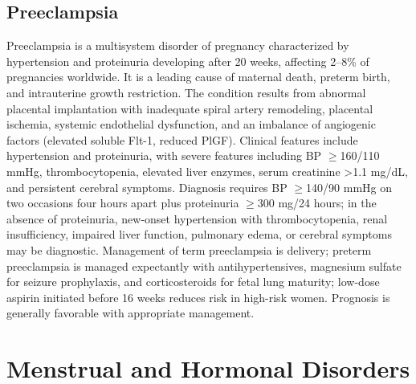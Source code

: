 \subsection{Preeclampsia}
\label{sec:Preeclampsia}
Preeclampsia is a multisystem disorder of pregnancy characterized by hypertension and proteinuria developing after 20 weeks, affecting 2--8\% of pregnancies worldwide. It is a leading cause of maternal death, preterm birth, and intrauterine growth restriction. The condition results from abnormal placental implantation with inadequate spiral artery remodeling, placental ischemia, systemic endothelial dysfunction, and an imbalance of angiogenic factors (elevated soluble Flt-1, reduced PlGF). Clinical features include hypertension and proteinuria, with severe features including BP $\ge$160/110 mmHg, thrombocytopenia, elevated liver enzymes, serum creatinine >1.1 mg/dL, and persistent cerebral symptoms. Diagnosis requires BP $\ge$140/90 mmHg on two occasions four hours apart plus proteinuria $\ge$300 mg/24 hours; in the absence of proteinuria, new-onset hypertension with thrombocytopenia, renal insufficiency, impaired liver function, pulmonary edema, or cerebral symptoms may be diagnostic. Management of term preeclampsia is delivery; preterm preeclampsia is managed expectantly with antihypertensives, magnesium sulfate for seizure prophylaxis, and corticosteroids for fetal lung maturity; low-dose aspirin initiated before 16 weeks reduces risk in high-risk women. Prognosis is generally favorable with appropriate management.

\section{Menstrual and Hormonal Disorders}







